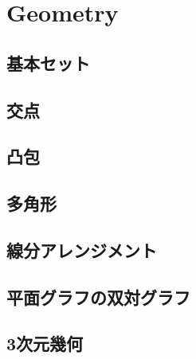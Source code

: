 \section{Geometry}

\subsection{基本セット}


\subsection{交点}


\subsection{凸包}


\subsection{多角形}


\subsection{線分アレンジメント}


\subsection{平面グラフの双対グラフ}


\subsection{3次元幾何}

